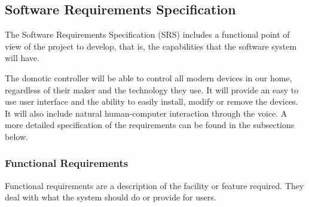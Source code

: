 \subsection{Software Requirements Specification}
The Software Requirements Specification (SRS) includes a functional point of view of the project to develop, that is, the capabilities
that the software system will have.

The domotic controller will be able to control all modern devices in our home, regardless of their maker and the technology they use.
It will provide an easy to use user interface and the ability to easily install, modify or remove the devices. It will also include natural
human-computer interaction through the voice. A more detailed specification of the requirements can be found in the subsections
below.

\subsubsection{Functional Requirements}
Functional requirements are a description of the facility or feature required. They deal with what the system should do or provide
for users.\cite{sqaFunctionalNonFunctional}

